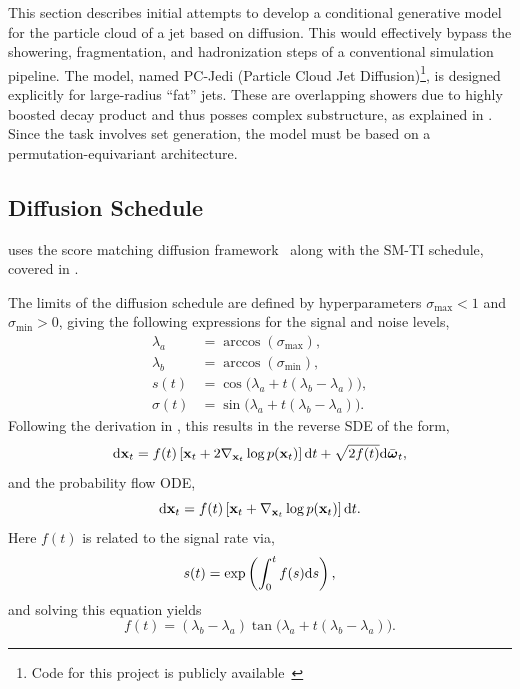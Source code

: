 This section describes initial attempts to develop a conditional generative model for the particle cloud of a jet based on diffusion.
This would effectively bypass the showering, fragmentation, and hadronization steps of a conventional simulation pipeline.
The model, named PC-Jedi (Particle Cloud Jet Diffusion)\footnote{Code for this project is publicly available~\cite{PCJediCode}}, is designed explicitly for large-radius ``fat'' jets.
These are overlapping showers due to highly boosted decay product and thus posses complex substructure, as explained in .
Since the task involves set generation, the model must be based on a permutation-equivariant architecture.

\subsection{Diffusion Schedule}

\pcjedi uses the score matching diffusion framework~\cite{ScoreBasedGenerativeModeling} along with the SM-TI schedule, covered in .

The limits of the diffusion schedule are defined by hyperparameters $\sigma_\text{max}<1$ and $\sigma_\text{min}>0$, giving the following expressions for the signal and noise levels,
\begin{align}
    \lambda_a & = \arccos(\sigma_\text{max}),                           \\
    \lambda_b & = \arccos(\sigma_\text{min}),                           \\
    s(t)      & = \cos\bigl(\lambda_a + t(\lambda_b - \lambda_a)\bigr), \\
    \sigma(t) & = \sin\bigl(\lambda_a + t(\lambda_b - \lambda_a)\bigr).
\end{align}
Following the derivation in , this results in the reverse SDE of the form,
\begin{equation}
    \label{eq:jedi_reverse_vp_sde}
    \mathrm{d}\mathbf{x}_t = f(t) \left[ \mathbf{x}_t + 2 \nabla_{\mathbf{x}_t} \log p(\mathbf{x}_t) \right] \mathrm{d} t + \sqrt{2 f(t)} \mathrm{d} \bar{\boldsymbol{\omega}}_t,
\end{equation}
and the probability flow ODE,
\begin{equation}
    \label{eq:jedi_vp_ode}
    \mathrm{d} \mathbf{x}_t = f(t) \left[ \mathbf{x}_t + \nabla_{\mathbf{x}_t} \log p(\mathbf{x}_t) \right] \mathrm{d} t.
\end{equation}
Here $f(t)$ is related to the signal rate via,
\begin{equation}
    s(t) = \exp\left(\int_0^t f(s) \mathrm{d} s\right),
\end{equation}
and solving this equation yields
\begin{equation}
    f(t) = (\lambda_b - \lambda_a) \tan\bigl(\lambda_a + t(\lambda_b - \lambda_a)\bigr).
\end{equation}

